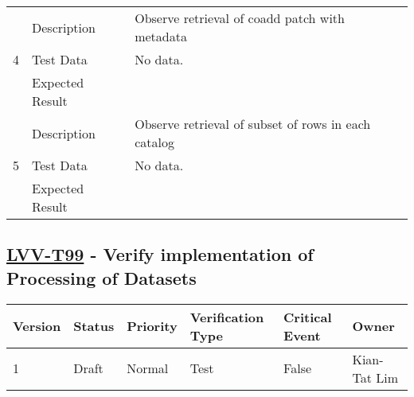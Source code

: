 \begin{longtable}[]{p{1.3cm}p{2cm}p{13cm}}
            \multirow{3}{*}{ 4 } & Description &
            \begin{minipage}[t]{13cm}{\footnotesize
            Observe retrieval of coadd patch with metadata

            \vspace{\dp0}
            } \end{minipage} \\ \cline{2-3}
            & Test Data &
            \begin{minipage}[t]{13cm}{\footnotesize
                No data.
                \vspace{\dp0}
            } \end{minipage} \\ \cline{2-3}
            & Expected Result &
        \\ \midrule

            \multirow{3}{*}{ 5 } & Description &
            \begin{minipage}[t]{13cm}{\footnotesize
            Observe retrieval of subset of rows in each catalog

            \vspace{\dp0}
            } \end{minipage} \\ \cline{2-3}
            & Test Data &
            \begin{minipage}[t]{13cm}{\footnotesize
                No data.
                \vspace{\dp0}
            } \end{minipage} \\ \cline{2-3}
            & Expected Result &
        \\ \midrule
    \end{longtable}

\subsection{\href{https://jira.lsstcorp.org/secure/Tests.jspa\#/testCase/LVV-T99}{LVV-T99}
    - Verify implementation of Processing of Datasets}\label{lvv-t99}

\begin{longtable}[]{llllll}
\toprule
Version & Status & Priority & Verification Type & Critical Event & Owner
\\\midrule
1 & Draft & Normal &
Test & False & Kian-Tat Lim
\\\bottomrule
\end{longtable}

